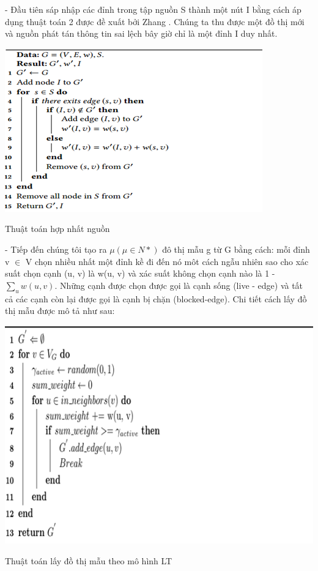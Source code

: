 		- Đầu tiên sáp nhập các đỉnh trong tập nguồn S thành một nút I bằng cách áp dụng thuật toán 2 được đề xuất bởi Zhang \cite{zhang39}. Chúng ta thu được một đồ thị mới và nguồn phát tán thông tin sai lệch bây giờ chỉ là một đỉnh I duy nhất.
		\begin{center}
			\includegraphics[scale=.5]{picture/HopNhat}
			
			Thuật toán hợp nhất nguồn
		\end{center}
		
		- Tiếp đến chúng tôi tạo ra $\mu(\mu \in N*)$ đô thị mẫu g từ G bằng cách: mỗi đỉnh v $\in$ V chọn nhiều nhất một đỉnh kề đi đến nó môt cách ngẫu nhiên sao cho xác suất chọn cạnh (u, v) là w(u, v) và xác suất không chọn cạnh nào là 1 - $\sum_{u} w(u, v)$. Những cạnh được chọn được gọi là cạnh sống  (live - edge) và tất cả các cạnh còn lại được gọi là cạnh bị chặn (blocked-edge). Chi tiết cách lấy đồ thị mẫu được mô tả như sau:
		\begin{center}
			\includegraphics[scale=.5]{picture/LT}
			
			Thuật toán lấy đồ thị mẫu theo mô hình LT
		\end{center}
	
